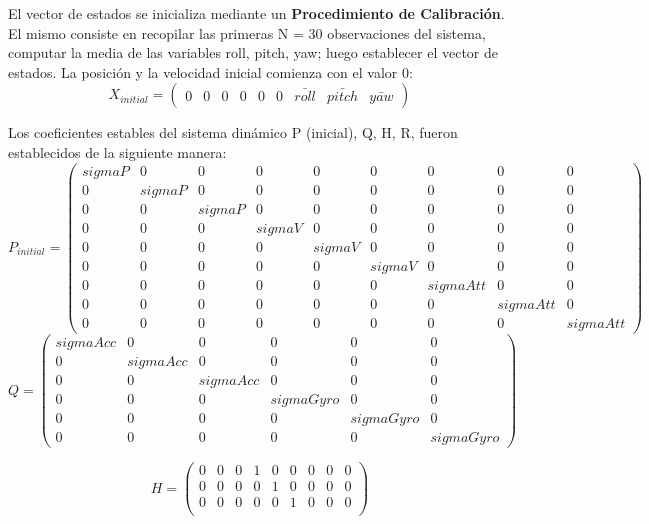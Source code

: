 El vector de estados se inicializa mediante un \textbf{Procedimiento de Calibración}. El mismo consiste en recopilar las primeras N = 30 observaciones del sistema, computar la media de las variables roll, pitch, yaw; luego establecer el vector de estados. La posición y la velocidad inicial comienza con el valor 0:
\begin{equation*}
    X_{initial}= \begin{pmatrix}
0&0&0&0&0&0& \bar{roll}& \bar{pitch}& \bar{yaw}
\end{pmatrix}
\end{equation*}

Los coeficientes estables del sistema dinámico P (inicial), Q, H, R, fueron establecidos de la siguiente manera:
\begin{equation*}
    P_{initial}  = \begin{pmatrix}
sigmaP&0&0&0&0&0&0&0&0\\    
0&sigmaP&0&0&0&0&0&0&0\\
0&0&sigmaP&0&0&0&0&0&0\\
0&0&0&sigmaV&0&0&0&0&0\\
0&0&0&0&sigmaV&0&0&0&0\\
0&0&0&0&0&sigmaV&0&0&0\\
0&0&0&0&0&0&sigmaAtt&0&0\\
0&0&0&0&0&0&0&sigmaAtt&0\\
0&0&0&0&0&0&0&0&sigmaAtt
\end{pmatrix} 
\end{equation*}
\begin{equation*}
Q  = \begin{pmatrix}
sigmaAcc&0&0&0&0&0\\    
0&sigmaAcc&0&0&0&0\\
0&0&sigmaAcc&0&0&0\\
0&0&0&sigmaGyro&0&0\\
0&0&0&0&sigmaGyro&0\\
0&0&0&0&0&sigmaGyro
\end{pmatrix}
\end{equation*}

\begin{equation*}
H  = \begin{pmatrix}
0&0&0&1&0&0&0&0&0\\    
0&0&0&0&1&0&0&0&0\\
0&0&0&0&0&1&0&0&0\\
\end{pmatrix}
\end{equation*}

